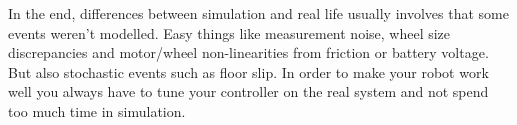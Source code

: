 \documentclass[a4paper,12pt,oneside,onecolumn]{article} %
\begin{document}
In the end, differences between simulation and real life usually involves that some events weren't modelled. Easy things like measurement noise, wheel size discrepancies and motor/wheel non-linearities from friction or battery voltage. But also stochastic events such as floor slip. In order to make your robot work well you always have to tune your controller on the real system and not spend too much time in simulation.




%
%
\end{document}
